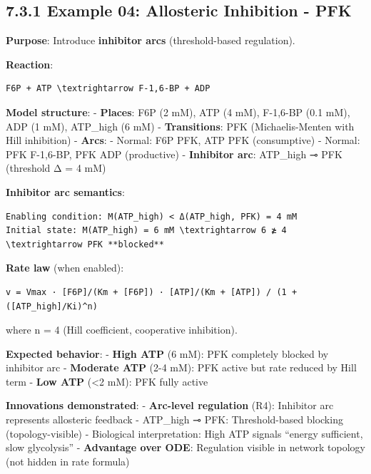 \hypertarget{example-04-allosteric-inhibition---pfk}{%
\subsection{7.3.1 Example 04: Allosteric Inhibition -
PFK}\label{example-04-allosteric-inhibition---pfk}}

\textbf{Purpose}: Introduce \textbf{inhibitor arcs} (threshold-based
regulation).

\textbf{Reaction}:

\begin{lstlisting}
F6P + ATP \textrightarrow F-1,6-BP + ADP
\end{lstlisting}

\textbf{Model structure}: - \textbf{Places}: F6P (2 mM), ATP (4 mM),
F-1,6-BP (0.1 mM), ADP (1 mM), ATP\_high (6 mM) - \textbf{Transitions}:
PFK (Michaelis-Menten with Hill inhibition) - \textbf{Arcs}: - Normal:
F6P \textrightarrow PFK, ATP \textrightarrow PFK (consumptive) - Normal: PFK \textrightarrow F-1,6-BP, PFK \textrightarrow ADP
(productive) - \textbf{Inhibitor arc}: ATP\_high ⊸ PFK (threshold Δ = 4
mM)

\textbf{Inhibitor arc semantics}:

\begin{lstlisting}
Enabling condition: M(ATP_high) < Δ(ATP_high, PFK) = 4 mM
Initial state: M(ATP_high) = 6 mM \textrightarrow 6 ≱ 4 \textrightarrow PFK **blocked**
\end{lstlisting}

\textbf{Rate law} (when enabled):

\begin{lstlisting}
v = Vmax · [F6P]/(Km + [F6P]) · [ATP]/(Km + [ATP]) / (1 + ([ATP_high]/Ki)^n)
\end{lstlisting}

where n = 4 (Hill coefficient, cooperative inhibition).

\textbf{Expected behavior}: - \textbf{High ATP} (6 mM): PFK completely
blocked by inhibitor arc - \textbf{Moderate ATP} (2-4 mM): PFK active
but rate reduced by Hill term - \textbf{Low ATP} (\textless2 mM): PFK
fully active

\textbf{Innovations demonstrated}: - \checkmark \textbf{Arc-level regulation}
(R4): Inhibitor arc represents allosteric feedback - ATP\_high ⊸ PFK:
Threshold-based blocking (topology-visible) - Biological interpretation:
High ATP signals ``energy sufficient, slow glycolysis'' -
\textbf{Advantage over ODE}: Regulation visible in network topology (not
hidden in rate formula)

